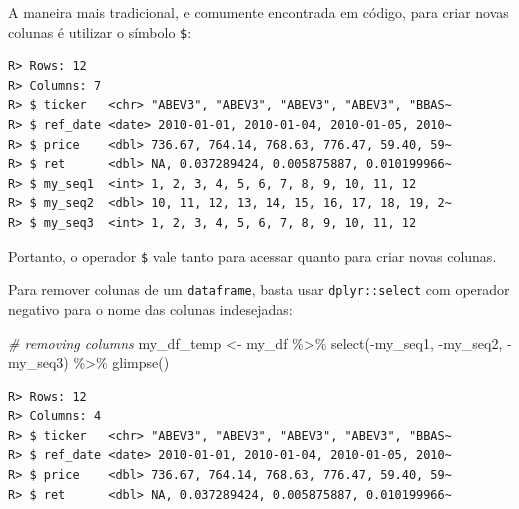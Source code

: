 \documentclass[
  11pt,
]{book}
\newenvironment{Shaded}{\begin{snugshade}}{\end{snugshade}}
\newcommand{\CommentTok}[1]{\textcolor[rgb]{0.37,0.37,0.37}{\textit{#1}}}
\newcommand{\DecValTok}[1]{\textcolor[rgb]{0.06,0.06,0.06}{#1}}
\newcommand{\FunctionTok}[1]{\textcolor[rgb]{0,0,0}{#1}}
\newcommand{\NormalTok}[1]{#1}
\newcommand{\OtherTok}[1]{\textcolor[rgb]{0.37,0.37,0.37}{#1}}
\newcommand{\SpecialCharTok}[1]{\textcolor[rgb]{0,0,0}{#1}}
\begin{document}
A maneira mais tradicional, e comumente encontrada em código, para criar novas colunas é utilizar o símbolo \texttt{\$}:

\begin{Shaded}
\end{Shaded}

\begin{verbatim}
R> Rows: 12
R> Columns: 7
R> $ ticker   <chr> "ABEV3", "ABEV3", "ABEV3", "ABEV3", "BBAS~
R> $ ref_date <date> 2010-01-01, 2010-01-04, 2010-01-05, 2010~
R> $ price    <dbl> 736.67, 764.14, 768.63, 776.47, 59.40, 59~
R> $ ret      <dbl> NA, 0.037289424, 0.005875887, 0.010199966~
R> $ my_seq1  <int> 1, 2, 3, 4, 5, 6, 7, 8, 9, 10, 11, 12
R> $ my_seq2  <dbl> 10, 11, 12, 13, 14, 15, 16, 17, 18, 19, 2~
R> $ my_seq3  <int> 1, 2, 3, 4, 5, 6, 7, 8, 9, 10, 11, 12
\end{verbatim}

Portanto, o operador \texttt{\$} vale tanto para acessar quanto para criar novas colunas.

Para remover colunas de um \texttt{dataframe}, basta usar \texttt{dplyr::select} com operador negativo para o nome das colunas indesejadas:

\begin{Shaded}
\begin{Highlighting}[]
\CommentTok{\# removing columns}
\NormalTok{my\_df\_temp }\OtherTok{\textless{}{-}}\NormalTok{ my\_df }\SpecialCharTok{\%\textgreater{}\%}
  \FunctionTok{select}\NormalTok{(}\SpecialCharTok{{-}}\NormalTok{my\_seq1, }\SpecialCharTok{{-}}\NormalTok{my\_seq2, }\SpecialCharTok{{-}}\NormalTok{my\_seq3) }\SpecialCharTok{\%\textgreater{}\%}
  \FunctionTok{glimpse}\NormalTok{()}
\end{Highlighting}
\end{Shaded}

\begin{verbatim}
R> Rows: 12
R> Columns: 4
R> $ ticker   <chr> "ABEV3", "ABEV3", "ABEV3", "ABEV3", "BBAS~
R> $ ref_date <date> 2010-01-01, 2010-01-04, 2010-01-05, 2010~
R> $ price    <dbl> 736.67, 764.14, 768.63, 776.47, 59.40, 59~
R> $ ret      <dbl> NA, 0.037289424, 0.005875887, 0.010199966~
\end{verbatim}
\end{document}

